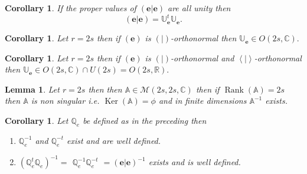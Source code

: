 \documentclass[aps,preprint]{revtex4}%
\newtheorem{corollary}[theorem]{Corollary}
\newtheorem{lemma}[theorem]{Lemma}
\begin{document}
\begin{corollary}
If the proper values of $\left(  \left.  \mathbf{e}\right\vert \mathbf{e}%
\right)  $ are all unity then
\begin{equation}
\left(  \left.  \mathbf{e}\right\vert \mathbf{e}\right)  =\mathbb{U}%
_{\mathbf{e}}^{t}\mathbb{U}_{\mathbf{e}}.
\end{equation}

\end{corollary}

\begin{corollary}
Let $r=2s$ then if $\left(  \mathbf{e}\right)  $ is $\left(  \left.
{}\right\vert \right)  $-orthonormal then $\mathbb{U}_{\mathbf{e}}\in O\left(
2s,\mathbb{C}\right)  .$
\end{corollary}

\begin{corollary}
Let $r=2s$ then if $\left(  \mathbf{e}\right)  $ is $\left(  \left.
{}\right\vert \right)  $-orthonormal \emph{and} $\left\langle \left.
{}\right\vert \right\rangle $-orthonormal then $\mathbb{U}_{\mathbf{e}}\in
O\left(  2s,\mathbb{C}\right)  \cap U\left(  2s\right)  =O\left(
2s,\mathbb{R}\right)  .$
\end{corollary}

\begin{lemma}
Let $r=2s$ then then $\mathbb{A\in}\mathcal{M}\left(  2s,2s,\mathbb{C}\right)
$ then if $\operatorname*{Rank}(\mathbb{A})=2s$ then $\mathbb{A}$ is non
singular i.e. $\operatorname{Ker}\left(  \mathbb{A}\right)  =\phi$ and in
finite dimensions $\mathbb{A}^{-1}$ exists.
\end{lemma}

\begin{corollary}
Let $\mathbb{Q}_{e}$ be defined as in the preceding then

\begin{enumerate}
\item $\mathbb{Q}_{e}^{-1}$ and $\mathbb{Q}_{e}^{-t}$ exist and are well defined.

\item $\left(  \mathbb{Q}_{e}^{t}\mathbb{Q}_{e}\right)  ^{-1}=$ $\mathbb{Q}%
_{e}^{-1}\mathbb{Q}_{e}^{-t}$ $=\left(  \left.  \mathbf{e}\right\vert
\mathbf{e}\right)  ^{-1}$ exists and is well defined.
\end{enumerate}
\end{corollary}
\end{document}
